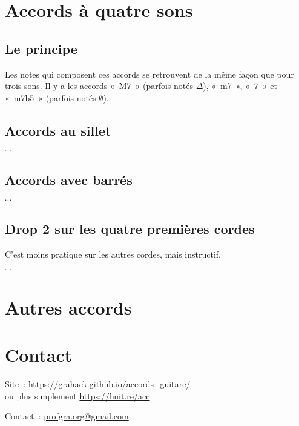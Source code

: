 \documentclass[11pt]{article}
\begin{document}
\section{Accords à quatre sons}

\subsection{Le principe}

Les notes qui composent ces accords se retrouvent de la même façon que pour
trois sons. Il y a les accords «~M7~» (parfois notés $\Delta$), «~m7~», «~7~»
et «~m7b5~» (parfois notés $\emptyset$).

\subsection{Accords au sillet}

$\cdots$

\subsection{Accords avec barrés}

$\cdots$

\subsection{Drop 2 sur les quatre premières cordes}

C’est moins pratique sur les autres cordes, mais instructif.

$\cdots$

\section{Autres accords}


\section{Contact} \label{contact}

\setlength{\parindent}{0pt}

Site~: \url{https://grahack.github.io/accords_guitare/} \\
ou plus simplement \url{https://huit.re/acc}

Contact~: \url{profgra.org@gmail.com}
\end{document}
